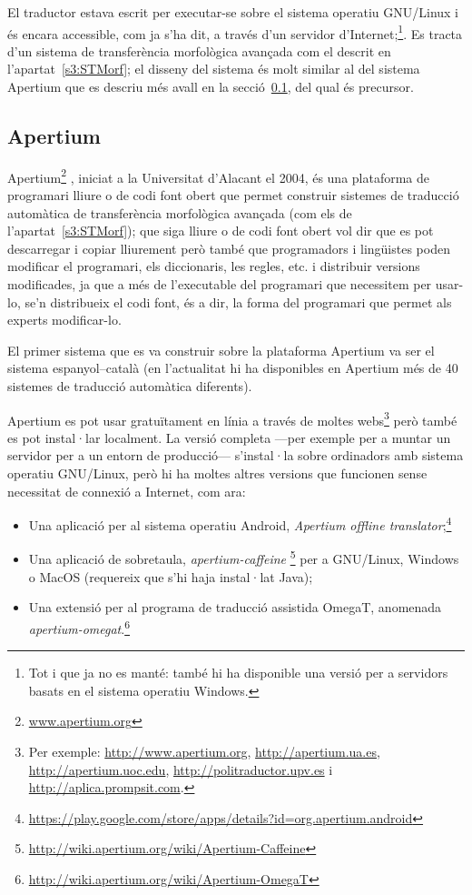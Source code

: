 El traductor estava escrit per executar-se sobre el sistema operatiu
GNU/\-Linux i és encara accessible, com ja s'ha dit, a través d'un
servidor d'Internet;\footnote{Tot i que ja no es manté: també hi ha
  disponible una versió per a servidors basats en el sistema operatiu
  Windows.}. Es tracta d'un sistema de transferència morfològica avançada com
el descrit en l'apartat~\ref{s3:STMorf}; el disseny del sistema és
molt similar al del sistema Apertium que es descriu més avall en la
secció~\ref{ss:apertium}, del qual és precursor.

\subsection{Apertium}
\label{ss:apertium}

Apertium\footnote{\url{www.apertium.org}} \citep{forcada2011apertium},
iniciat a la Universitat d'Alacant el 2004, és una plataforma de
programari lliure o de codi font obert que permet construir sistemes
de traducció automàtica de transferència morfològica avançada (com els
de l'apartat~\ref{s3:STMorf}); que siga lliure o de codi font obert vol dir que es pot descarregar i
copiar lliurement però també que programadors i lingüistes poden
modificar el programari, els diccionaris, les regles, etc. i
distribuir versions modificades, ja que a més de l'executable del
programari que necessitem per usar-lo, se'n distribueix el codi font,
és a dir, la forma del programari que permet als experts modificar-lo.

El primer sistema que es va construir sobre la plataforma Apertium va
ser el sistema espanyol--català (en l'actualitat hi ha disponibles en
Apertium més de 40 sistemes de traducció automàtica diferents).

Apertium es pot usar gratuïtament en línia a través de moltes
webs\footnote{Per exemple: \url{http://www.apertium.org},
  \url{http://apertium.ua.es}, \url{http://apertium.uoc.edu},
  \url{http://politraductor.upv.es} i
  \url{http://aplica.prompsit.com}.} però també es pot instal·lar 
localment. La versió completa ---per exemple per a muntar un servidor
per a un entorn de producció--- s'instal·la sobre ordinadors amb sistema
operatiu GNU/Linux, però hi ha moltes altres versions que funcionen sense necessitat de connexió a Internet, com ara:
\begin{itemize}
\item Una aplicació per al sistema operatiu Android, \emph{Apertium
    offline
    translator};\footnote{\url{https://play.google.com/store/apps/details?id=org.apertium.android}}
\item Una aplicació de sobretaula, \emph{apertium-caffeine}
  \footnote{\url{http://wiki.apertium.org/wiki/Apertium-Caffeine}} per
  a GNU/Linux, Windows o MacOS (requereix que s'hi haja instal·lat
  Java);
\item Una extensió per al programa de traducció assistida OmegaT, anomenada \emph{apertium-omegat}.\footnote{\url{http://wiki.apertium.org/wiki/Apertium-OmegaT}}
\end{itemize}




